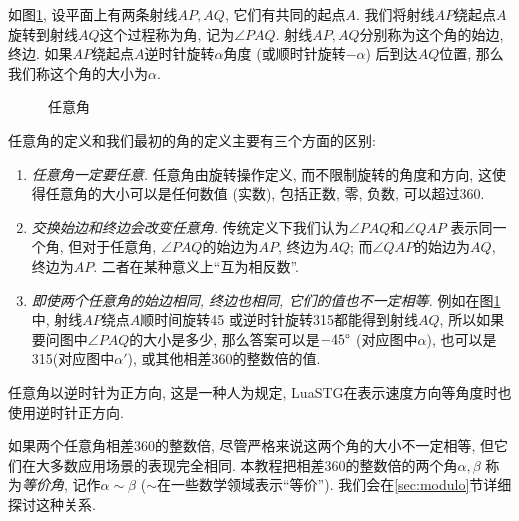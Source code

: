 \begin{definition}[任意角]
  如图\ref{fig:angle},
  设平面上有两条射线$AP,AQ$, 它们有共同的起点$A$.
  我们将射线$AP$绕起点$A$旋转到射线$AQ$这个过程称为角,
  记为$\angle PAQ$.
  射线$AP,AQ$分别称为这个角的始边, 终边.
  如果$AP$绕起点$A$逆时针旋转$\alpha$角度
  (或顺时针旋转$-\alpha$) 后到达$AQ$位置,
  那么我们称这个角的大小为$\alpha$.

  \begin{figure}[htbp]
    \centering
    \caption{任意角}
    \label{fig:angle}
  \end{figure}
\end{definition}

任意角的定义和我们最初的角的定义主要有三个方面的区别:
\begin{enumerate}[label=(\arabic*)]
  \item \emph{任意角一定要任意.}
        任意角由旋转操作定义, 而不限制旋转的角度和方向,
        这使得任意角的大小可以是任何数值 (实数),
        包括正数, 零, 负数,
        可以超过360\degree.
  \item \emph{交换始边和终边会改变任意角.}
        传统定义下我们认为$\angle{PAQ}$和$\angle{QAP}$
        表示同一个角, 但对于任意角,
        $\angle{PAQ}$的始边为$AP$, 终边为$AQ$;
        而$\angle{QAP}$的始边为$AQ$, 终边为$AP$.
        二者在某种意义上``互为相反数''.
  \item \emph{即使两个任意角的始边相同, 终边也相同, 它们的值也不一定相等.}
        例如在图\ref{fig:angle}中,
        射线$AP$绕点$A$顺时间旋转45\degree
        或逆时针旋转315\degree 都能得到射线$AQ$,
        所以如果要问图中$\angle{PAQ}$的大小是多少,
        那么答案可以是$-45\degree$ (对应图中$\alpha$),
        也可以是315\degree (对应图中$\alpha'$),
        或其他相差360\degree 的整数倍的值.
\end{enumerate}

任意角以逆时针为正方向, 这是一种人为规定,
LuaSTG在表示速度方向等角度时也使用逆时针正方向.

如果两个任意角相差360\degree 的整数倍,
尽管严格来说这两个角的大小不一定相等,
但它们在大多数应用场景的表现完全相同.
本教程把相差360\degree 的整数倍的两个角$\alpha,\beta$
称为\emph{等价角}, 记作$\alpha\sim\beta$
($\sim$在一些数学领域表示``等价'').
我们会在\ref{sec:modulo}节详细探讨这种关系.

